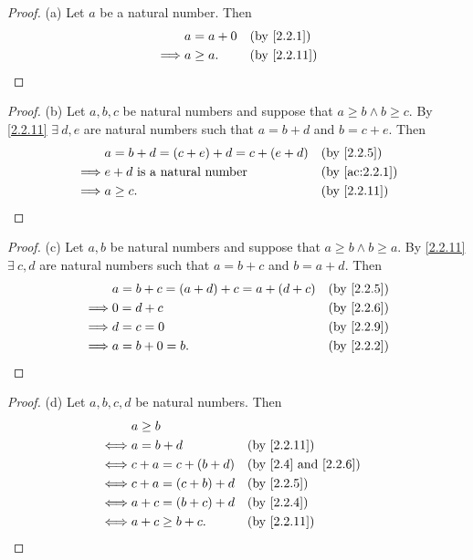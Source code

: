 \begin{proof}{(a)}
  Let \(a\) be a natural number.
  Then
  \begin{align*}
             & a = a + 0 &  & \text{(by \cref{2.2.1})}  \\
    \implies & a \geq a. &  & \text{(by \cref{2.2.11})}
  \end{align*}
\end{proof}

\begin{proof}{(b)}
  Let \(a, b, c\) be natural numbers and suppose that \(a \geq b \land b \geq c\).
  By \cref{2.2.11} \(\exists\ d, e\) are natural numbers such that \(a = b + d\) and \(b = c + e\).
  Then
  \begin{align*}
             & a = b + d = (c + e) + d = c + (e + d) &  & \text{(by \cref{2.2.5})}    \\
    \implies & e + d \text{ is a natural number}     &  & \text{(by \cref{ac:2.2.1})} \\
    \implies & a \geq c.                             &  & \text{(by \cref{2.2.11})}   \\
  \end{align*}
\end{proof}

\begin{proof}{(c)}
  Let \(a, b\) be natural numbers and suppose that \(a \geq b \land b \geq a\).
  By \cref{2.2.11} \(\exists\ c, d\) are natural numbers such that \(a = b + c\) and \(b = a + d\).
  Then
  \begin{align*}
             & a = b + c = (a + d) + c = a + (d + c) &  & \text{(by \cref{2.2.5})} \\
    \implies & 0 = d + c                             &  & \text{(by \cref{2.2.6})} \\
    \implies & d = c = 0                             &  & \text{(by \cref{2.2.9})} \\
    \implies & a = b + 0 = b.                        &  & \text{(by \cref{2.2.2})}
  \end{align*}
\end{proof}

\begin{proof}{(d)}
  Let \(a, b, c, d\) be natural numbers.
  Then
  \begin{align*}
         & a \geq b                                                         \\
    \iff & a = b + d           &  & \text{(by \cref{2.2.11})}               \\
    \iff & c + a = c + (b + d) &  & \text{(by \cref{2.4} and \cref{2.2.6})} \\
    \iff & c + a = (c + b) + d &  & \text{(by \cref{2.2.5})}                \\
    \iff & a + c = (b + c) + d &  & \text{(by \cref{2.2.4})}                \\
    \iff & a + c \geq b + c.   &  & \text{(by \cref{2.2.11})}
  \end{align*}
\end{proof}

